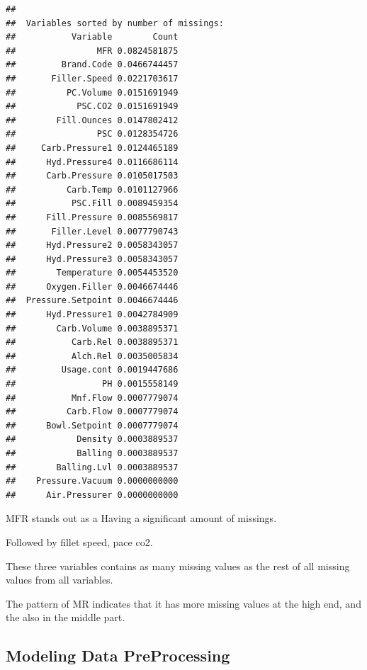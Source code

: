 \documentclass[]{article}
\begin{document}
\begin{verbatim}
## 
##  Variables sorted by number of missings: 
##           Variable        Count
##                MFR 0.0824581875
##         Brand.Code 0.0466744457
##       Filler.Speed 0.0221703617
##          PC.Volume 0.0151691949
##            PSC.CO2 0.0151691949
##        Fill.Ounces 0.0147802412
##                PSC 0.0128354726
##     Carb.Pressure1 0.0124465189
##      Hyd.Pressure4 0.0116686114
##      Carb.Pressure 0.0105017503
##          Carb.Temp 0.0101127966
##           PSC.Fill 0.0089459354
##      Fill.Pressure 0.0085569817
##       Filler.Level 0.0077790743
##      Hyd.Pressure2 0.0058343057
##      Hyd.Pressure3 0.0058343057
##        Temperature 0.0054453520
##      Oxygen.Filler 0.0046674446
##  Pressure.Setpoint 0.0046674446
##      Hyd.Pressure1 0.0042784909
##        Carb.Volume 0.0038895371
##           Carb.Rel 0.0038895371
##           Alch.Rel 0.0035005834
##         Usage.cont 0.0019447686
##                 PH 0.0015558149
##           Mnf.Flow 0.0007779074
##          Carb.Flow 0.0007779074
##      Bowl.Setpoint 0.0007779074
##            Density 0.0003889537
##            Balling 0.0003889537
##        Balling.Lvl 0.0003889537
##    Pressure.Vacuum 0.0000000000
##      Air.Pressurer 0.0000000000
\end{verbatim}

MFR stands out as a Having a significant amount of missings.

Followed by fillet speed, pace co2.

These three variables contains as many missing values as the rest of all
missing values from all variables.

The pattern of MR indicates that it has more missing values at the high
end, and the also in the middle part.

\subsection{Modeling Data
PreProcessing}\label{modeling-data-preprocessing}
\end{document}
